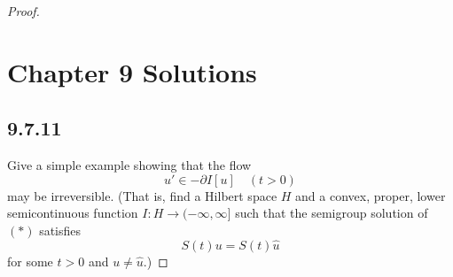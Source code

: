 \documentclass{article}
\begin{document}
\begin{flushleft}
\begin{proof}
\section{Chapter 9 Solutions}
\subsection{\textbf{9.7.11}} Give a simple example showing that the flow
\begin{equation}
u'\in -\partial I[u]\quad (t>0) \tag{*}
\end{equation}
may be irreversible. (That is, find a Hilbert space $H$ and a convex, proper, lower semicontinuous function $I:H\to (-\infty,\infty]$ such that the semigroup solution of $(*)$ satisfies 
$$S(t)u=S(t)\hat{u}$$
for some $t>0$ and $u\neq \hat{u}$.)


\end{proof}
\end{flushleft}
\end{document}
